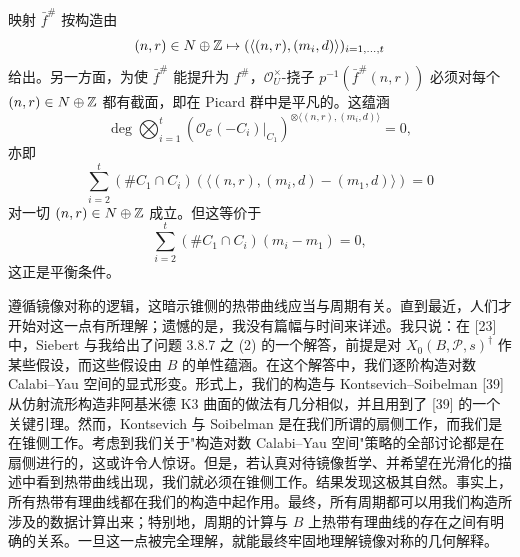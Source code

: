 映射 $\bar f^\#$ 按构造由
\[
(n,r)\in N\oplus\mathbb{Z}\mapsto(\langle(n,r),(m_i,d)\rangle)_{i=1,\dots,t}
\]
给出。另一方面，为使 $\bar f^\#$ 能提升为 $f^\#$，$\mathcal O_U^\times$-挠子 $p^{-1}(\bar f^\#(n,r))$ 必须对每个 $(n,r)\in N\oplus\mathbb{Z}$ 都有截面，即在 Picard 群中是平凡的。这蕴涵
\[
\deg\bigotimes_{i=1}^t(\mathcal O_{\mathcal C}(-C_i)|_{C_1})^{\otimes\langle(n,r),(m_i,d)\rangle}=0,
\]
亦即
\[
\sum_{i=2}^t(\#C_1\cap C_i)(\langle(n,r),(m_i,d)-(m_1,d)\rangle)=0
\]
对一切 $(n,r)\in N\oplus\mathbb{Z}$ 成立。但这等价于
\[
\sum_{i=2}^t(\#C_1\cap C_i)(m_i-m_1)=0,
\]
这正是平衡条件。\proofend

遵循镜像对称的逻辑，这暗示锥侧的热带曲线应当与周期有关。直到最近，人们才开始对这一点有所理解；遗憾的是，我没有篇幅与时间来详述。我只说：在 [23] 中，Siebert 与我给出了问题 3.8.7 之 (2) 的一个解答，前提是对 $X_0(B,\mathcal P,s)^\dagger$ 作某些假设，而这些假设由 $B$ 的单性蕴涵。在这个解答中，我们逐阶构造对数 Calabi--Yau 空间的显式形变。形式上，我们的构造与 Kontsevich--Soibelman [39] 从仿射流形构造非阿基米德 K3 曲面的做法有几分相似，并且用到了 [39] 的一个关键引理。然而，Kontsevich 与 Soibelman 是在我们所谓的扇侧工作，而我们是在锥侧工作。考虑到我们关于"构造对数 Calabi--Yau 空间"策略的全部讨论都是在扇侧进行的，这或许令人惊讶。但是，若认真对待镜像哲学、并希望在光滑化的描述中看到热带曲线出现，我们就必须在锥侧工作。结果发现这极其自然。事实上，所有热带有理曲线都在我们的构造中起作用。最终，所有周期都可以用我们构造所涉及的数据计算出来；特别地，周期的计算与 $B$ 上热带有理曲线的存在之间有明确的关系。一旦这一点被完全理解，就能最终牢固地理解镜像对称的几何解释。
